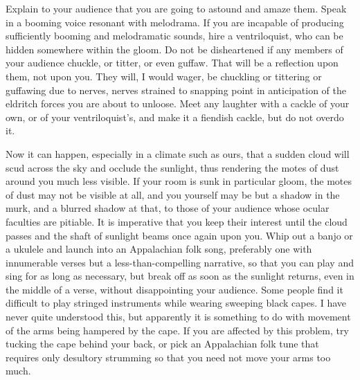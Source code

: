 Explain to your audience that you are going to astound and amaze them. Speak in a booming voice resonant with melodrama. If you are incapable of producing sufficiently booming and melodramatic sounds, hire a ventriloquist, who can be hidden somewhere within the gloom. Do not be disheartened if any members of your audience chuckle, or titter, or even guffaw. That will be a reflection upon them, not upon you. They will, I would wager, be chuckling or tittering or guffawing due to nerves, nerves strained to snapping point in anticipation of the eldritch forces you are about to unloose. Meet any laughter with a cackle of your own, or of your ventriloquist's, and make it a fiendish cackle, but do not overdo it.

Now it can happen, especially in a climate such as ours, that a sudden cloud will scud across the sky and occlude the sunlight, thus rendering the motes of dust around you much less visible. If your room is sunk in particular gloom, the motes of dust may not be visible at all, and you yourself may be but a shadow in the murk, and a blurred shadow at that, to those of your audience whose ocular faculties are pitiable. It is imperative that you keep their interest until the cloud passes and the shaft of sunlight beams once again upon you. Whip out a banjo or a ukulele and launch into an Appalachian folk song, preferably one with innumerable verses but a less-than-compelling narrative, so that you can play and sing for as long as necessary, but break off as soon as the sunlight returns, even in the middle of a verse, without disappointing your audience. Some people find it difficult to play stringed instruments while wearing sweeping black capes. I have never quite understood this, but apparently it is something to do with movement of the arms being hampered by the cape. If you are affected by this problem, try tucking the cape behind your back, or pick an Appalachian folk tune that requires only desultory strumming so that you need not move your arms too much.

